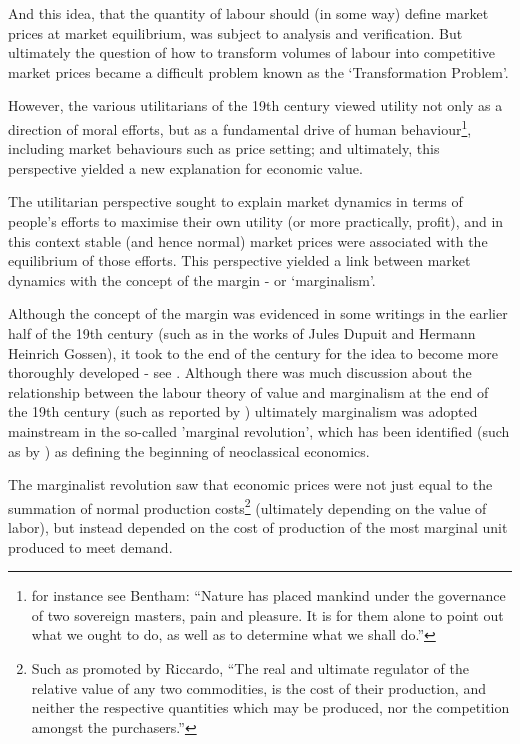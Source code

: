 And this idea, that the quantity of labour should (in some way) define market prices at market equilibrium, was subject to analysis and verification.
But ultimately the question of how to transform volumes of labour into competitive market prices became a difficult problem known as the `Transformation Problem'.

However, the various utilitarians of the 19th century viewed utility not only as a direction of moral efforts, but as a fundamental drive of human behaviour\footnote{for instance see Bentham: ``Nature has placed mankind under the governance of two sovereign masters, pain and pleasure.
It is for them alone to point out what we ought to do, as well as to determine what we shall do.''\cite{bentham1823introduction}}, including market behaviours such as price setting; and ultimately, this perspective yielded a new explanation for economic value.

The utilitarian perspective sought to explain market dynamics in terms of people's efforts to maximise their own utility (or more practically, profit), and in this context stable (and hence normal) market prices were associated with the equilibrium of those efforts.
This perspective yielded a link between market dynamics with the concept of the margin - or `marginalism'.

Although the concept of the margin was evidenced in some writings in the earlier half of the 19th century (such as in the works of Jules Dupuit and Hermann Heinrich Gossen), it took to the end of the century for the idea to become more thoroughly developed - see \cite{RePEc:ucp:jpolec:v:58:y:1950:p:307}.
Although there was much discussion about the relationship between the labour theory of value and marginalism at the end of the 19th century (such as reported by \cite{steedman2003socialism}) ultimately marginalism was adopted mainstream in the so-called 'marginal revolution', which has been identified (such as by \cite{marginalism1}) as defining the beginning of neoclassical economics.

The marginalist revolution saw that economic prices were not just equal to the summation of normal production costs\footnote{Such as promoted by Riccardo, ``The real and ultimate regulator of the relative value of any two commodities, is the cost of their production, and neither the respective quantities which may be produced, nor the competition amongst the purchasers.''\cite{Riccardo1Gutenberg}} (ultimately depending on the value of labor), but instead depended on the cost of production of the most marginal unit produced to meet demand.

